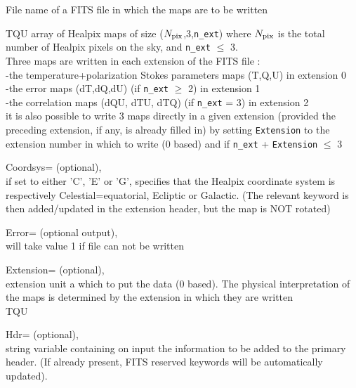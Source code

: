 \begin{qualifiers}
  \begin{qulist}{} %
 	\item[{File}] 
          name of a FITS file in which the maps are to be written

   \item[{TQU}]  array of Healpix maps of size ($N_{\mathrm{pix}}$,3,{\tt n\_ext}) where $N_{\mathrm{pix}}$ is the total
   number of Healpix pixels on the sky, and {\tt n\_ext} $\le$ 3.\\
     Three maps are written in each extension of the FITS file : \\
      -the temperature+polarization Stokes parameters maps (T,Q,U) in
   extension 0 \\
      -the error maps (dT,dQ,dU) (if {\tt n\_ext} $\ge$ 2) in extension 1 \\
      -the correlation maps (dQU, dTU, dTQ) (if {\tt n\_ext} = 3) in extension 2
\\
     it is also possible to write 3 maps directly in a given
     extension (provided the preceding extension, if any, is already
     filled in)
     by setting {\tt Extension} to the extension number in which to write
     (0 based) and if {\tt n\_ext} + {\tt Extension} $\le$ 3

       \item[{Coordsys=}] 
		  (optional), \\
		if set to either 'C', 'E' or 'G',  specifies that the
		Healpix coordinate system is respectively Celestial=equatorial,
		  Ecliptic or Galactic.
		(The relevant keyword is then added/updated in the extension
		  header, but the map is NOT rotated)

	\item[{Error=}] 
		(optional output), \\
		will take value 1 if file can not be written


       \item[{Extension=}]
		(optional), \\
	extension unit a which to put the data (0 based). The physical
		interpretation of the maps is determined by the
		extension in which they are written\\
	\seealso TQU

       \item[{Hdr=}]
		  (optional), \\
		string variable containing on input  the information to be added
		  to the primary header. (If already present, FITS reserved
		  keywords will be automatically updated).


\end{qulist}
\end{qualifiers}
